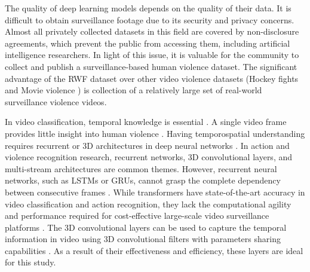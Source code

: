 \documentclass[review]{elsarticle}
\begin{document}
The quality of deep learning models depends on the quality of their data. It is difficult to obtain surveillance footage due to its security and privacy concerns. Almost all privately collected datasets in this field are covered by non-disclosure agreements, which prevent the public from accessing them, including artificial intelligence researchers. In light of this issue, it is valuable for the community to collect and publish a surveillance-based human violence dataset. The significant advantage of the RWF dataset \citep{cheng2021rwf} over other video violence datasets (Hockey fights \citep{nievas2011violence} and Movie violence \citep{gong2008detecting}) is collection of a relatively large set of real-world surveillance violence videos.


In video classification, temporal knowledge is essential \citep{yao2016spatio, murthy2014influence}. A single video frame provides little insight into human violence \citep{feichtenhofer2016convolutional}. Having temporospatial understanding requires recurrent or 3D architectures in deep neural networks \citep{feichtenhofer2016convolutional, yao2016spatio, algamdi2019learning, du2017recurrent}. In action and violence recognition research, recurrent networks, 3D convolutional layers, and multi-stream architectures are common themes\citep{zong2021motion, wang2021multi, shi2020skeleton}. However, recurrent neural networks, such as LSTMs or GRUs, cannot grasp the complete dependency between consecutive frames \citep{zeyer2019comparison, ezen2020comparison, wang2019language}. While transformers have state-of-the-art accuracy in video classification and action recognition, they lack the computational agility and performance required for cost-effective large-scale video surveillance platforms \citep{arnab2021vivit, girdhar2019video}. The 3D convolutional layers can be used to capture the temporal information in video using 3D convolutional filters with parameters sharing capabilities \citep{feichtenhofer2016convolutional, yao2016spatio, algamdi2019learning, du2017recurrent}. As a result of their effectiveness and efficiency, these layers are ideal for this study.
\end{document}
